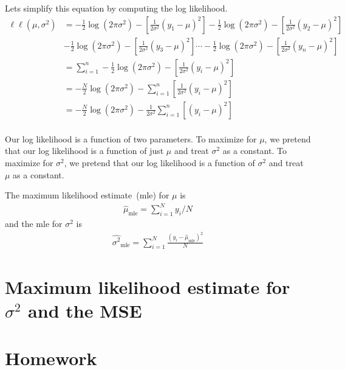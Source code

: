 Lets simplify this equation by computing the log likelihood. 
\begin{align*}
    \ell \ell ( \mu, \sigma^{2}) &= -\frac{1}{2} \log \left(2 \pi \sigma^{2}\right) - \left[  \frac{1}{2 \sigma^{2}} \left (y_{1} - \mu \right)^{2} \right] 
    -\frac{1}{2} \log \left(2 \pi \sigma^{2}\right) - \left[  \frac{1}{2 \sigma^{2}} \left (y_{2} - \mu \right)^{2} \right]\\
    &-\frac{1}{2} \log \left(2 \pi \sigma^{2}\right) - \left[  \frac{1}{2 \sigma^{2}} \left (y_{3} - \mu \right)^{2} \right]
    \cdots 
    -\frac{1}{2} \log \left(2 \pi \sigma^{2}\right) - \left[  \frac{1}{2 \sigma^{2}} \left (y_{n} - \mu \right)^{2} \right] \\
    &= \sum_{i=1}^{n} -\frac{1}{2} \log \left(2 \pi \sigma^{2}\right) - \left[  \frac{1}{2 \sigma^{2}} \left (y_{i} - \mu \right)^{2} \right] \\
    &= - \frac{N}{2} \log \left(2 \pi \sigma^{2}\right) - \sum_{i=1}^{n} \left[  \frac{1}{2 \sigma^{2}} \left (y_{i} - \mu \right)^{2} \right] \\
    &= - \frac{N}{2} \log \left(2 \pi \sigma^{2}\right) - \frac{1}{2 \sigma^{2}} \sum_{i=1}^{n} \left[   \left (y_{i} - \mu \right)^{2} \right] \\
\end{align*}

Our log likelihood is a function of two parameters. 
To maximize for $\mu$, we pretend that our log likelihood is a function of just $\mu$ and treat $\sigma^{2}$ as a constant. 
To maximize for $\sigma^{2}$, we pretend that our log likelihood is a function of $\sigma^{2}$ and treat $\mu$ as a constant.

The maximum likelihood estimate~(mle) for $\mu$ is 
\begin{align}
    \hat{\mu}_{\text{mle}} = \sum_{i=1}^{N} y_{i}  /  N 
\end{align}
and the mle for $\sigma^{2}$ is 
\begin{align}
    \hat{\sigma^{2}}_{\text{mle}} = \sum_{i=1}^{N} \frac{\left(y_{i} - \hat{\mu}_{\text{mle}} \right)^{2}}{N} 
\end{align}

\section{Maximum likelihood estimate for $\sigma^{2}$ and the MSE}



\section{Homework}

